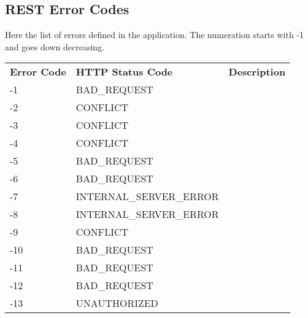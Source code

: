 \subsection{REST Error Codes}
Here the list of errors defined in the application. The numeration starts with -1 and goes down decreasing.

\begin{longtable}{|p{}|p{} |p{}|} 
	\hline
	\textbf{Error Code} & \textbf{HTTP Status Code} & \textbf{Description} \\	
	-1 & BAD\_REQUEST \\
	-2 & CONFLICT & \\	
	-3 & CONFLICT & \\
	-4 & CONFLICT & \\
	-5 & BAD\_REQUEST & \\
	-6 & BAD\_REQUEST & \\
	-7 & INTERNAL\_SERVER\_ERROR & \\	
	-8 & INTERNAL\_SERVER\_ERROR & \\
	-9 & CONFLICT & \\
	-10 & BAD\_REQUEST & \\
	-11 & BAD\_REQUEST & \\
	-12 & BAD\_REQUEST & \\
	-13 & UNAUTHORIZED & \\

	
	
	
\end{longtable}